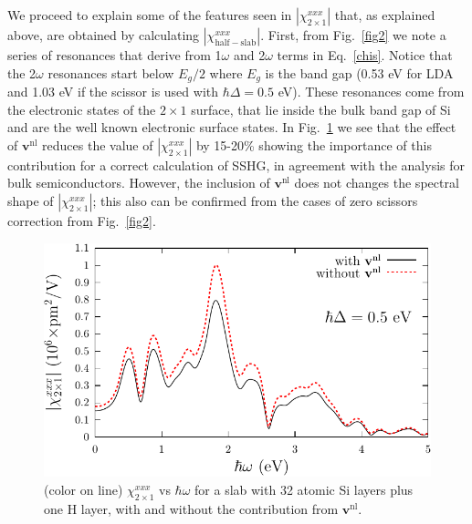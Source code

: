 We proceed to explain some of the features seen in $|\chi^{xxx}_{2\times 1}|$
that, as explained above, are obtained by calculating
$|\chi^{xxx}_{\mathrm{half-slab}}|$. First, from Fig.~\ref{fig2} we note a
series of resonances that derive from 1$\omega$ and 2$\omega$ terms in
Eq.~\eqref{chis}. Notice that the 2$\omega$ resonances start below $E_g/2$ where
$E_g$ is the band gap (0.53 eV  for LDA and 1.03 eV if the scissor is used with
$\hbar\Delta=0.5$ eV). These resonances come from the electronic states of the
$2\times 1$ surface, that lie inside the bulk band gap of Si and are the well
known electronic surface states.\cite{rohlfingPRB95} In Fig.~\ref{fig3} we see
that the effect of $\mathbf{v}^\mathrm{nl}$ reduces the value of
$|\chi^{xxx}_{2\times 1}|$ by 15-20\% showing the importance of this
contribution for a correct calculation of SSHG, in agreement with the analysis
for bulk semiconductors.\cite{luppiPRB08} However, the inclusion of
$\mathbf{v}^\mathrm{nl}$ does not changes the spectral shape of
$|\chi^{xxx}_{2\times 1}|$; this also can be confirmed from the cases of zero
scissors correction from Fig.~\ref{fig2}.
\begin{figure}
\centering 
\includegraphics[scale=.8]{figures/03-results/chi2/fig5}
\caption{(color on line) 
$\chi^{xxx}_{2\times 1}$ vs $\hbar\omega$ for a slab with 32 atomic Si layers
plus one H layer, with and without the contribution from
$\mathbf{v}^\mathrm{nl}$.
\label{fig3}} 
\end{figure}

